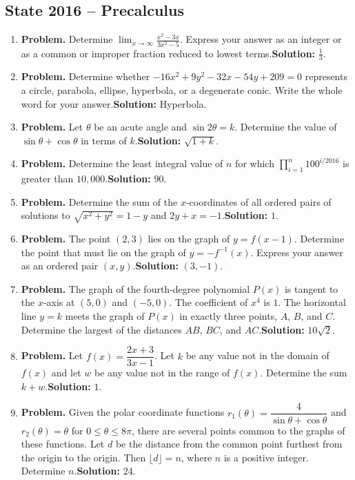 \documentclass[10pt]{article}
\begin{document}

\subsection*{State 2016 -- Precalculus}
\begin{enumerate}
  \item \textbf{Problem.} Determine $\displaystyle\lim_{x\to\infty}\frac{x^2-3x}{3x^2-5}$. Express your answer as an integer or as a common or improper fraction reduced to lowest terms.\quad \textbf{Solution:} $\frac13$.
  \item \textbf{Problem.} Determine whether $-16x^2+9y^2-32x-54y+209=0$ represents a circle, parabola, ellipse, hyperbola, or a degenerate conic. Write the whole word for your answer.\quad \textbf{Solution:} Hyperbola.
  \item \textbf{Problem.} Let $\theta$ be an acute angle and $\sin 2\theta=k$. Determine the value of $\sin\theta+\cos\theta$ in terms of $k$.\quad \textbf{Solution:} $\sqrt{1+k}$.
  \item \textbf{Problem.} Determine the least integral value of $n$ for which $\displaystyle\prod_{i=1}^{n}100^{i/2016}$ is greater than $10{,}000$.\quad \textbf{Solution:} $90$.
  \item \textbf{Problem.} Determine the sum of the $x$-coordinates of all ordered pairs of solutions to $\sqrt{x^2+y^2}=1-y$ and $2y+x=-1$.\quad \textbf{Solution:} $1$.
  \item \textbf{Problem.} The point $(2,3)$ lies on the graph of $y=f(x-1)$. Determine the point that must lie on the graph of $y=-f^{-1}(x)$. Express your answer as an ordered pair $(x,y)$.\quad \textbf{Solution:} $(3,-1)$.
  \item \textbf{Problem.} The graph of the fourth-degree polynomial $P(x)$ is tangent to the $x$-axis at $(5,0)$ and $(-5,0)$. The coefficient of $x^4$ is $1$. The horizontal line $y=k$ meets the graph of $P(x)$ in exactly three points, $A$, $B$, and $C$. Determine the largest of the distances $AB$, $BC$, and $AC$.\quad \textbf{Solution:} $10\sqrt2$.
  \item \textbf{Problem.} Let $f(x)=\dfrac{2x+3}{3x-1}$. Let $k$ be any value not in the domain of $f(x)$ and let $w$ be any value not in the range of $f(x)$. Determine the sum $k+w$.\quad \textbf{Solution:} $1$.
  \item \textbf{Problem.} Given the polar coordinate functions $r_1(\theta)=\dfrac{4}{\sin\theta+\cos\theta}$ and $r_2(\theta)=\theta$ for $0\leq\theta\leq8\pi$, there are several points common to the graphs of these functions. Let $d$ be the distance from the common point furthest from the origin to the origin. Then $\lfloor d\rfloor=n$, where $n$ is a positive integer. Determine $n$.\quad \textbf{Solution:} $24$.

\end{enumerate}
\end{document}
